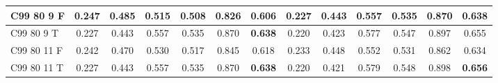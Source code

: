 \documentclass{article}
\begin{document}
\begin{tabular}{|l|c|c|c|c|c|c||c|c|c|c|c|c|}
C99 80  9 F & 0.247 & 0.485 & 0.515 & 0.508 & 0.826 & 0.606 & 0.227 & 0.443 & 0.557 & 0.535 & 0.870 & 0.638\\ \hline
C99 80  9 T & 0.227 & 0.443 & 0.557 & 0.535 & 0.870 & \textbf{0.638} & 0.220 & 0.423 & 0.577 & 0.547 & 0.897 & 0.655\\ \hline
C99 80 11 F & 0.242 & 0.470 & 0.530 & 0.517 & 0.845 & 0.618 & 0.233 & 0.448 & 0.552 & 0.531 & 0.862 & 0.634\\ \hline
C99 80 11 T & 0.227 & 0.443 & 0.557 & 0.535 & 0.870 & \textbf{0.638} & 0.220 & 0.421 & 0.579 & 0.548 & 0.898 & \textbf{0.656}\\ \hline
\end{tabular} 
\end{document}

